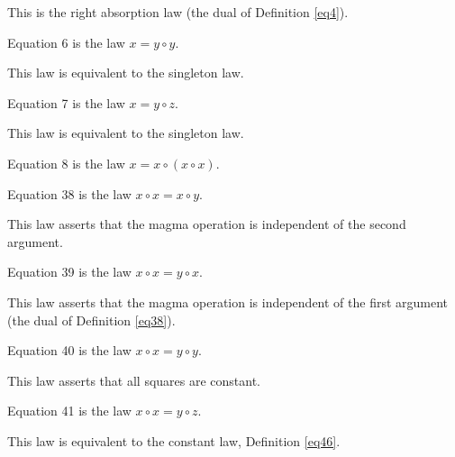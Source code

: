 This is the right absorption law (the dual of Definition \ref{eq4}).

\begin{definition}[Equation 6]\label{eq6}\leanok{}  Equation 6 is the law $x=y \circ y$.
\end{definition}

This law is equivalent to the singleton law.

\begin{definition}[Equation 7]\label{eq7}\leanok{}  Equation 7 is the law $x=y \circ z$.
\end{definition}

This law is equivalent to the singleton law.

\begin{definition}[Equation 8]\label{eq8}\leanok{}  Equation 8 is the law $x=x \circ (x \circ x)$.
\end{definition}

\begin{definition}[Equation 38]\label{eq38}\leanok{}  Equation 38 is the law $x \circ x = x \circ y$.
\end{definition}

This law asserts that the magma operation is independent of the second argument.

\begin{definition}[Equation 39]\label{eq39}\leanok{}  Equation 39 is the law $x \circ x = y \circ x$.
\end{definition}

This law asserts that the magma operation is independent of the first argument (the dual of Definition \ref{eq38}).

\begin{definition}[Equation 40]\label{eq40}\leanok{}  Equation 40 is the law $x \circ x = y \circ y$.
\end{definition}

This law asserts that all squares are constant.

\begin{definition}[Equation 41]\label{eq41}\leanok{}  Equation 41 is the law $x \circ x = y \circ z$.
\end{definition}

This law is equivalent to the constant law, Definition \ref{eq46}.

